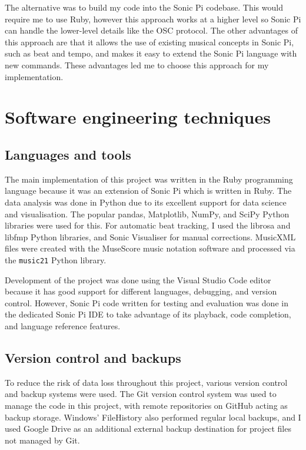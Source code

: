 \documentclass[12pt,twoside,openright]{report}
\begin{document}
The alternative was to build my code into the Sonic Pi codebase. This would
require me to use Ruby, however this approach works at a higher level so Sonic Pi can
handle the lower-level details like the OSC protocol. The other advantages of this approach are
that it allows the use of existing musical concepts in Sonic Pi, such as beat and
tempo, and makes it easy to extend the Sonic Pi language with new commands.
These advantages led me to choose this approach for my implementation.



\section{Software engineering techniques} \label{software_engineering_techniques}

\subsection{Languages and tools} \label{languages_and_tools}

The main implementation of this project was written in the Ruby programming
language because it was an extension of Sonic Pi which is written in Ruby. The
data analysis was done in Python due to its excellent support for data science
and visualisation. The popular pandas, Matplotlib, NumPy, and SciPy Python
libraries were used for this. For automatic beat tracking, I used the librosa
and libfmp Python libraries, and Sonic Visualiser for manual corrections.
MusicXML files were created with the MuseScore music notation software and
processed via the \verb'music21' Python library.

Development of the project was done using the Visual Studio Code editor because
it has good support for different languages, debugging, and version control.
However, Sonic Pi code written for testing and evaluation was done in the
dedicated Sonic Pi IDE to take advantage of its playback, code completion, and
language reference features.


\subsection{Version control and backups}

To reduce the risk of data loss throughout this project, various version control
and backup systems were used. The Git version control system was used to manage
the code in this project, with remote repositories on GitHub acting as backup
storage. Windows' FileHistory also performed regular local backups, and I used
Google Drive as an additional external backup destination for project files not
managed by Git.
\end{document}
